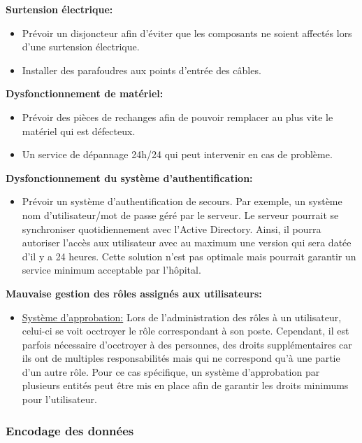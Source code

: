 \documentclass[12pt]{article}
\begin{document}
\justify
\textbf{Surtension électrique:}
\justify
\begin{itemize}
	\item Prévoir un disjoncteur afin d'éviter que les composants ne soient affectés lors d'une surtension électrique.
	\item Installer des parafoudres aux points d'entrée des câbles.
\end{itemize}

\justify
\textbf{Dysfonctionnement de matériel:}
\justify
\begin{itemize}
	\item Prévoir des pièces de rechanges afin de pouvoir remplacer au plus vite le matériel qui est défecteux.
	\item Un service de dépannage 24h/24 qui peut intervenir en cas de problème.
\end{itemize}

\justify
\textbf{Dysfonctionnement du système d'authentification:}
\justify
\begin{itemize} 
	\item Prévoir un système d'authentification de secours. Par exemple, un système nom d'utilisateur/mot de passe géré par le serveur. Le serveur pourrait se synchroniser quotidiennement avec l'Active Directory. Ainsi, il pourra autoriser l'accès aux utilisateur avec au maximum une version qui sera datée d'il y a 24 heures. Cette solution n'est pas optimale mais pourrait garantir un service minimum acceptable par l'hôpital.
\end{itemize}

\justify
\textbf{Mauvaise gestion des rôles assignés aux utilisateurs:}
\justify
\begin{itemize} 
	\item \underline{Système d'approbation:} Lors de l'administration des rôles à un utilisateur, celui-ci se voit occtroyer le rôle correspondant à son poste. Cependant, il est parfois nécessaire d'occtroyer à des personnes, des droits supplémentaires car ils ont de multiples responsabilités mais qui ne correspond qu'à une partie d'un autre rôle. Pour ce cas spécifique, un système d'approbation par plusieurs entités peut être mis en place afin de garantir les droits minimums pour l'utilisateur.
\end{itemize}

\subsubsection{Encodage des données}
\end{document}
